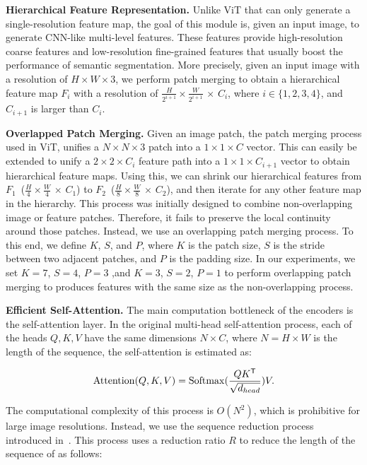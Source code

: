 \textbf{Hierarchical Feature Representation.} Unlike ViT that can only generate a single-resolution feature map, the goal of this module is, given an input image, to generate CNN-like multi-level features. These features provide high-resolution coarse features and low-resolution fine-grained features that usually boost the performance of semantic segmentation. More precisely, given an input image with a resolution of $H \times W \times 3$, we perform patch merging to obtain a hierarchical feature map $F_i$ with a resolution of $\frac{H}{2^{i+1}} \times \frac{W}{2^{i+1}}$ $\times$ $C_i$, where $i \in \{1,2,3,4\}$, and $C_{i+1}$ is larger than $C_i$.

\textbf{Overlapped Patch Merging.} Given an image patch, the patch merging process used in ViT, unifies a $N \times N \times 3$ patch into a $1 \times 1 \times C$ vector. This can easily be extended to unify a $2 \times 2 \times C_i$ feature path into a $1 \times 1 \times C_{i+1}$ vector to obtain hierarchical feature maps. Using this, we can shrink our hierarchical features from $F_1$~($\frac{H}{4} \times \frac{W}{4}$ $\times$ $C_1$) to $F_2$~($\frac{H}{8} \times \frac{W}{8}$ $\times$ $C_2$), and then iterate for any other feature map in the hierarchy. This process was initially designed to combine non-overlapping image or feature patches. Therefore, it fails to preserve the local continuity around those patches. Instead, we use an overlapping patch merging process. To this end, we define $K$, $S$, and $P$, where $K$ is the patch size, $S$ is the stride between two adjacent patches, and $P$ is the padding size. In our experiments, we set $K=7$, $S=4$, $P=3$ ,and $K=3$, $S=2$, $P=1$ to perform overlapping patch merging to produces features with the same size as the non-overlapping process.

\textbf{Efficient Self-Attention.} The main computation bottleneck of the encoders is the self-attention layer. In the original multi-head self-attention process, each of the heads $Q, K, V$ have the same dimensions $N \times C$, where $N=H \times W$ is the length of the sequence, the self-attention is estimated as:

\begin{equation}
    {\rm Attention}({Q}, {K}, {V}) = {\rm Softmax}(\frac{{Q}{K}^\mathsf{T}}{\sqrt{d_{head}}}){V}.
    \label{eqn:mhsa}
\end{equation}

The computational complexity of this process is $O(N^2)$, which is prohibitive for large image resolutions. Instead, we use the sequence reduction process introduced in~\cite{pvt}. This process uses a reduction ratio $R$ to reduce the length of the sequence of as follows:

